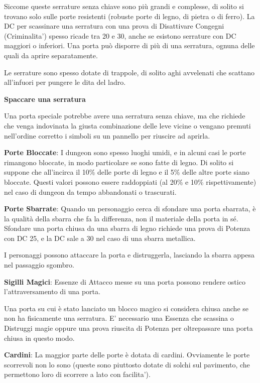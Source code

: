 \documentclass[a4paper,11pt,twoside,openany]{book}
\begin{document}
Siccome queste serrature senza chiave sono più grandi e complesse, di solito si trovano solo sulle porte resistenti (robuste porte di legno, di pietra o di ferro).
La DC per scassinare una serratura con una prova di Disattivare Congegni (Criminalita') spesso ricade tra 20 e 30, anche se esistono serrature con DC maggiori o inferiori. Una porta può disporre di più di una serratura, ognuna delle quali da aprire separatamente.

Le serrature sono spesso dotate di trappole, di solito aghi avvelenati che scattano all'infuori per pungere le dita del ladro.

\textbf{Spaccare una serratura}

Una porta speciale potrebbe avere una serratura senza chiave, ma che richiede che venga indovinata la giusta combinazione delle leve vicine o vengano premuti nell'ordine corretto i simboli su un pannello per riuscire ad aprirla.

\textbf{Porte Bloccate}: I dungeon sono spesso luoghi umidi, e in alcuni casi le porte rimangono bloccate, in modo particolare se sono fatte di legno. Di solito si suppone che all'incirca il 10\% delle porte di legno e il 5\% delle altre porte siano bloccate. Questi valori possono essere raddoppiati (al 20\% e 10\% rispettivamente) nel caso di dungeon da tempo abbandonati o trascurati.

\textbf{Porte Sbarrate}: Quando un personaggio cerca di sfondare una porta sbarrata, è la qualità della sbarra che fa la differenza, non il materiale della porta in sé. Sfondare una porta chiusa da una sbarra di legno richiede una prova di Potenza con DC 25, e la DC sale a 30 nel caso di una sbarra metallica.

I personaggi possono attaccare la porta e distruggerla, lasciando la sbarra appesa nel passaggio sgombro.

\textbf{Sigilli Magici}: Essenze di Attacco messe su una porta possono rendere ostico l'attraversamento di una porta.

Una porta su cui è stato lanciato un blocco magico si considera chiusa anche se non ha fisicamente una serratura. E' necessario una Essenza che scassina o Distruggi magie oppure una prova riuscita di Potenza per oltrepassare una porta chiusa in questo modo.

\textbf{Cardini}: La maggior parte delle porte è dotata di cardini. Ovviamente le porte scorrevoli non lo sono (queste sono piuttosto dotate di solchi sul pavimento, che permettono loro di scorrere a lato con facilita').
\end{document}
